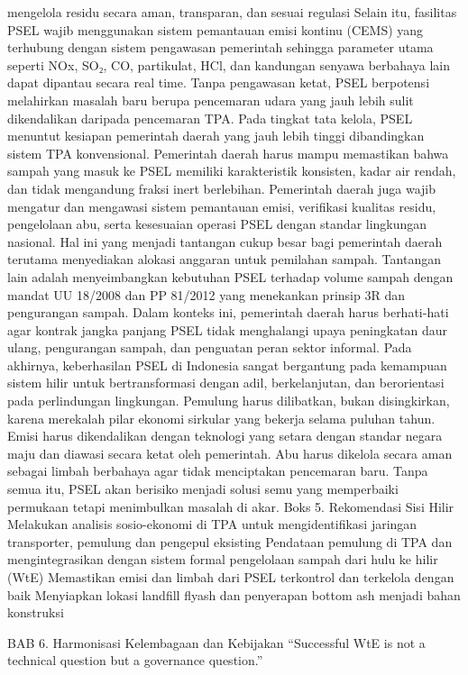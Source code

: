 \documentclass[
  letterpaper,
  DIV=11,
  numbers=noendperiod]{scrreprt}
\begin{document}
mengelola residu secara aman, transparan, dan sesuai regulasi Selain
itu, fasilitas PSEL wajib menggunakan sistem pemantauan emisi kontinu
(CEMS) yang terhubung dengan sistem pengawasan pemerintah sehingga
parameter utama seperti NOx, SO₂, CO, partikulat, HCl, dan kandungan
senyawa berbahaya lain dapat dipantau secara real time. Tanpa pengawasan
ketat, PSEL berpotensi melahirkan masalah baru berupa pencemaran udara
yang jauh lebih sulit dikendalikan daripada pencemaran TPA. Pada tingkat
tata kelola, PSEL menuntut kesiapan pemerintah daerah yang jauh lebih
tinggi dibandingkan sistem TPA konvensional. Pemerintah daerah harus
mampu memastikan bahwa sampah yang masuk ke PSEL memiliki karakteristik
konsisten, kadar air rendah, dan tidak mengandung fraksi inert
berlebihan. Pemerintah daerah juga wajib mengatur dan mengawasi sistem
pemantauan emisi, verifikasi kualitas residu, pengelolaan abu, serta
kesesuaian operasi PSEL dengan standar lingkungan nasional. Hal ini yang
menjadi tantangan cukup besar bagi pemerintah daerah terutama
menyediakan alokasi anggaran untuk pemilahan sampah. Tantangan lain
adalah menyeimbangkan kebutuhan PSEL terhadap volume sampah dengan
mandat UU 18/2008 dan PP 81/2012 yang menekankan prinsip 3R dan
pengurangan sampah. Dalam konteks ini, pemerintah daerah harus
berhati-hati agar kontrak jangka panjang PSEL tidak menghalangi upaya
peningkatan daur ulang, pengurangan sampah, dan penguatan peran sektor
informal. Pada akhirnya, keberhasilan PSEL di Indonesia sangat
bergantung pada kemampuan sistem hilir untuk bertransformasi dengan
adil, berkelanjutan, dan berorientasi pada perlindungan lingkungan.
Pemulung harus dilibatkan, bukan disingkirkan, karena merekalah pilar
ekonomi sirkular yang bekerja selama puluhan tahun. Emisi harus
dikendalikan dengan teknologi yang setara dengan standar negara maju dan
diawasi secara ketat oleh pemerintah. Abu harus dikelola secara aman
sebagai limbah berbahaya agar tidak menciptakan pencemaran baru. Tanpa
semua itu, PSEL akan berisiko menjadi solusi semu yang memperbaiki
permukaan tetapi menimbulkan masalah di akar. Boks 5. Rekomendasi Sisi
Hilir Melakukan analisis sosio-ekonomi di TPA untuk mengidentifikasi
jaringan transporter, pemulung dan pengepul eksisting Pendataan pemulung
di TPA dan mengintegrasikan dengan sistem formal pengelolaan sampah dari
hulu ke hilir (WtE) Memastikan emisi dan limbah dari PSEL terkontrol dan
terkelola dengan baik Menyiapkan lokasi landfill flyash dan penyerapan
bottom ash menjadi bahan konstruksi

BAB 6. Harmonisasi Kelembagaan dan Kebijakan ``Successful WtE is not a
technical question but a governance question.''
\end{document}
